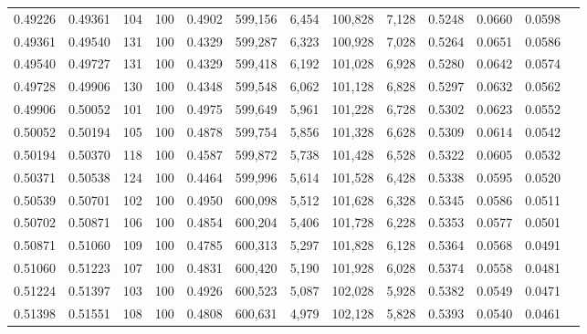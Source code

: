 \begin{tabular}{rrrrrrrrrrrrr}
0.49226 & 0.49361 &   104 & 100 &                                     0.4902 & 599,156 &   6,454 & 100,828 &   7,128 & 0.5248 & 0.0660 & 0.0598 \\
0.49361 & 0.49540 &   131 & 100 &                                     0.4329 & 599,287 &   6,323 & 100,928 &   7,028 & 0.5264 & 0.0651 & 0.0586 \\
0.49540 & 0.49727 &   131 & 100 &                                     0.4329 & 599,418 &   6,192 & 101,028 &   6,928 & 0.5280 & 0.0642 & 0.0574 \\
0.49728 & 0.49906 &   130 & 100 &                                     0.4348 & 599,548 &   6,062 & 101,128 &   6,828 & 0.5297 & 0.0632 & 0.0562 \\
0.49906 & 0.50052 &   101 & 100 &                                     0.4975 & 599,649 &   5,961 & 101,228 &   6,728 & 0.5302 & 0.0623 & 0.0552 \\
0.50052 & 0.50194 &   105 & 100 &                                     0.4878 & 599,754 &   5,856 & 101,328 &   6,628 & 0.5309 & 0.0614 & 0.0542 \\
0.50194 & 0.50370 &   118 & 100 &                                     0.4587 & 599,872 &   5,738 & 101,428 &   6,528 & 0.5322 & 0.0605 & 0.0532 \\
0.50371 & 0.50538 &   124 & 100 &                                     0.4464 & 599,996 &   5,614 & 101,528 &   6,428 & 0.5338 & 0.0595 & 0.0520 \\
0.50539 & 0.50701 &   102 & 100 &                                     0.4950 & 600,098 &   5,512 & 101,628 &   6,328 & 0.5345 & 0.0586 & 0.0511 \\
0.50702 & 0.50871 &   106 & 100 &                                     0.4854 & 600,204 &   5,406 & 101,728 &   6,228 & 0.5353 & 0.0577 & 0.0501 \\
0.50871 & 0.51060 &   109 & 100 &                                     0.4785 & 600,313 &   5,297 & 101,828 &   6,128 & 0.5364 & 0.0568 & 0.0491 \\
0.51060 & 0.51223 &   107 & 100 &                                     0.4831 & 600,420 &   5,190 & 101,928 &   6,028 & 0.5374 & 0.0558 & 0.0481 \\
0.51224 & 0.51397 &   103 & 100 &                                     0.4926 & 600,523 &   5,087 & 102,028 &   5,928 & 0.5382 & 0.0549 & 0.0471 \\
0.51398 & 0.51551 &   108 & 100 &                                     0.4808 & 600,631 &   4,979 & 102,128 &   5,828 & 0.5393 & 0.0540 & 0.0461 \\

\end{tabular}

